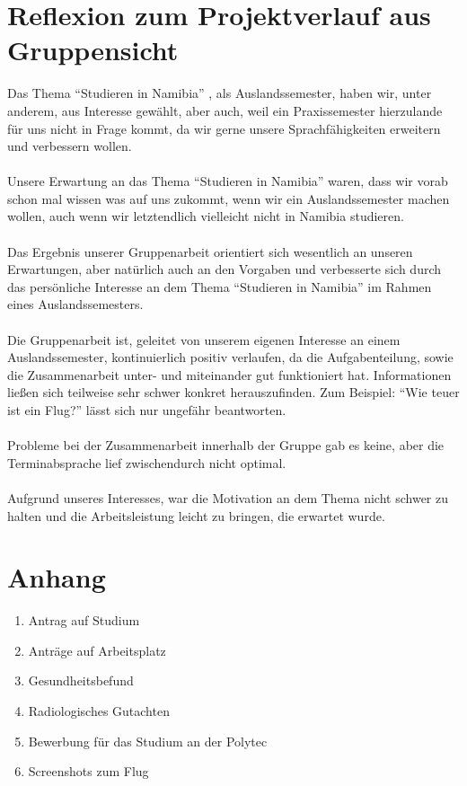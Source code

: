 \documentclass[11pt]{article}
\begin{document}
\section{Reflexion zum Projektverlauf aus Gruppensicht}
Das Thema "`Studieren in Namibia"' , als Auslandssemester, haben wir, unter anderem, 
aus Interesse gewählt, aber auch, weil ein Praxissemester hierzulande für uns nicht 
in Frage kommt, da wir gerne unsere Sprachfähigkeiten erweitern und verbessern wollen.
\\\\
Unsere Erwartung an das Thema "`Studieren in Namibia"' waren, dass wir vorab schon mal
wissen was auf uns zukommt, wenn wir ein Auslandssemester machen wollen, auch
wenn wir letztendlich vielleicht nicht in Namibia studieren.
\\\\
Das Ergebnis unserer Gruppenarbeit orientiert sich wesentlich an unseren Erwartungen,
aber natürlich auch an den Vorgaben und verbesserte sich durch das persönliche Interesse
an dem Thema "`Studieren in Namibia"' im Rahmen eines Auslandssemesters.
\\\\
Die Gruppenarbeit ist, geleitet von unserem eigenen Interesse an einem Auslandssemester,
kontinuierlich positiv verlaufen, da die Aufgabenteilung, sowie die Zusammenarbeit
unter- und miteinander gut funktioniert hat.
Informationen ließen sich teilweise sehr schwer konkret herauszufinden.
Zum Beispiel: "`Wie teuer ist ein Flug?"' lässt sich nur ungefähr beantworten.
\\\\
Probleme bei der Zusammenarbeit innerhalb der Gruppe gab es keine, aber die 
Terminabsprache lief zwischendurch nicht optimal.
\\\\
Aufgrund unseres Interesses, war die Motivation an dem Thema nicht schwer zu halten
und die Arbeitsleistung leicht zu bringen, die erwartet wurde.
\\

\section{Anhang}
\begin{enumerate}
\item Antrag auf Studium
\item Anträge auf Arbeitsplatz
\item Gesundheitsbefund
\item Radiologisches Gutachten
\item Bewerbung für das Studium an der Polytec
\item Screenshots zum Flug
\end{enumerate}
\end{document}
